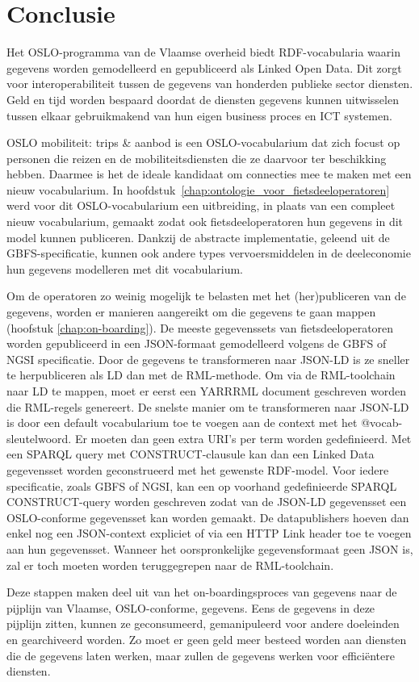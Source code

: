 \chapter{Conclusie}
\label{chap:conclusie}
Het OSLO-programma van de Vlaamse overheid biedt RDF-vocabularia waarin gegevens worden gemodelleerd en gepubliceerd als Linked Open Data. Dit zorgt voor interoperabiliteit tussen de gegevens van honderden publieke sector diensten. Geld en tijd worden bespaard doordat de diensten gegevens kunnen uitwisselen tussen elkaar gebruikmakend van hun eigen business proces en ICT systemen.

OSLO mobiliteit: trips \& aanbod is een OSLO-vocabularium dat zich focust op personen die reizen en de mobiliteitsdiensten die ze daarvoor ter beschikking hebben. Daarmee is het de ideale kandidaat om connecties mee te maken met een nieuw vocabularium.
In hoofdstuk~\ref{chap:ontologie_voor_fietsdeeloperatoren} werd voor dit OSLO-vocabularium een uitbreiding, in plaats van een compleet nieuw vocabularium, gemaakt zodat ook fietsdeeloperatoren hun gegevens in dit model kunnen publiceren. 
Dankzij de abstracte implementatie, geleend uit de GBFS-specificatie, kunnen ook andere types vervoersmiddelen in de deeleconomie hun gegevens modelleren met dit vocabularium.

Om de operatoren zo weinig mogelijk te belasten met het (her)publiceren van de gegevens, worden er manieren aangereikt om die gegevens te gaan mappen (hoofstuk \ref{chap:on-boarding}).
De meeste gegevenssets van fietsdeeloperatoren worden gepubliceerd in een JSON-formaat gemodelleerd volgens de GBFS of NGSI specificatie. Door de gegevens te transformeren naar JSON-LD is ze sneller te herpubliceren als LD dan met de RML-methode. Om via de RML-toolchain naar LD te mappen, moet er eerst een YARRRML document geschreven worden die RML-regels genereert. De snelste manier om te transformeren naar JSON-LD is door een default vocabularium toe te voegen aan de context met het @vocab-sleutelwoord. Er moeten dan geen extra URI's per term worden gedefinieerd. Met een SPARQL query met CONSTRUCT-clausule kan dan een Linked Data gegevensset worden geconstrueerd met het gewenste RDF-model. Voor iedere specificatie, zoals GBFS of NGSI, kan een op voorhand gedefinieerde SPARQL CONSTRUCT-query worden geschreven zodat van de JSON-LD gegevensset een OSLO-conforme gegevensset kan worden gemaakt. De datapublishers hoeven dan enkel nog een JSON-context expliciet of via een HTTP Link header toe te voegen aan hun gegevensset.
Wanneer het oorspronkelijke gegevensformaat geen JSON is, zal er toch moeten worden teruggegrepen naar de RML-toolchain.

Deze stappen maken deel uit van het on-boardingsproces van gegevens naar de pijplijn van Vlaamse, OSLO-conforme, gegevens. Eens de gegevens in deze pijplijn zitten, kunnen ze geconsumeerd, gemanipuleerd voor andere doeleinden en gearchiveerd worden. Zo moet er geen geld meer besteed worden aan diensten die de gegevens laten werken, maar zullen de gegevens werken voor efficiëntere diensten.